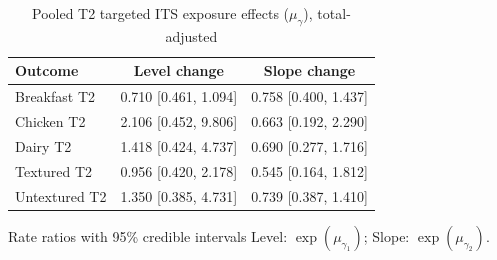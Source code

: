 \begin{table}[H]
\centering
\caption{Pooled T2 targeted ITS exposure effects ($\mu_\gamma$), total-adjusted}
\label{tab:a4_t2_mu_gamma_adj}
\begin{tabular}{lcc}
\toprule
Outcome & Level change & Slope change \\
\midrule
Breakfast T2 & 0.710 [0.461, 1.094] & 0.758 [0.400, 1.437] \\
Chicken T2 & 2.106 [0.452, 9.806] & 0.663 [0.192, 2.290] \\
Dairy T2 & 1.418 [0.424, 4.737] & 0.690 [0.277, 1.716] \\
Textured T2 & 0.956 [0.420, 2.178] & 0.545 [0.164, 1.812] \\
Untextured T2 & 1.350 [0.385, 4.731] & 0.739 [0.387, 1.410] \\
\bottomrule
\end{tabular}
\par\smallskip\footnotesize Rate ratios with 95\% credible intervals Level: $\exp(\mu_{\gamma_1})$; Slope: $\exp(\mu_{\gamma_2})$.
\end{table}
